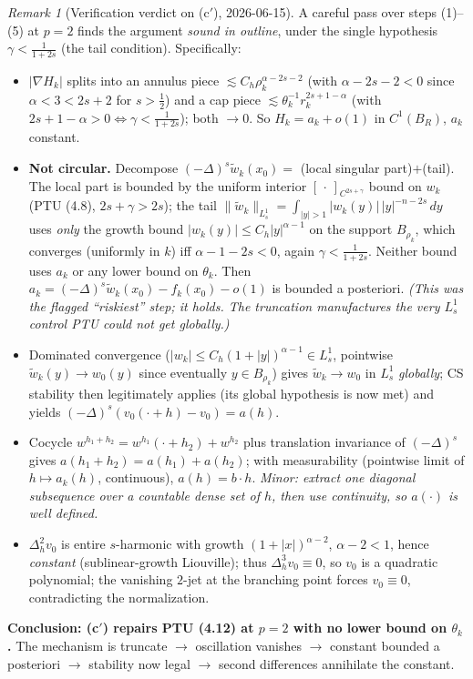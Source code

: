 \documentclass[11pt]{amsart}
\theoremstyle{plain}
\theoremstyle{definition}
\theoremstyle{remark}
\newtheorem{remark}[theorem]{Remark}
\newcommand{\al}{\alpha}
\begin{document}
\begin{remark}[Verification verdict on (c$'$), 2026-06-15]\label{rem:cprime-check}
A careful pass over steps (1)--(5) at $p=2$ finds the argument
\emph{sound in outline}, under the single hypothesis
$\gamma<\frac{1}{1+2s}$ (the tail condition). Specifically:
\begin{itemize}
\item[(1)] $|\nabla H_k|$ splits into an annulus piece
  $\lesssim C_h\rho_k^{\al-2s-2}$ (with $\al-2s-2<0$ since $\al<3<2s+2$
  for $s>\frac12$) and a cap piece $\lesssim\theta_k^{-1}r_k^{2s+1-\al}$
  (with $2s+1-\al>0\iff\gamma<\frac1{1+2s}$); both $\to0$. So
  $H_k=a_k+o(1)$ in $C^1(B_R)$, $a_k$ constant. \checkmark
\item[(2)] \textbf{Not circular.} Decompose
  $(-\Delta)^s\tilde w_k(x_0)=$ (local singular part)$+$(tail). The local
  part is bounded by the uniform interior $[\,\cdot\,]_{C^{2s+\gamma}}$
  bound on $w_k$ (PTU (4.8), $2s+\gamma>2s$); the tail
  $\|\tilde w_k\|_{L^1_s}=\int_{|y|>1}|w_k(y)|\,|y|^{-n-2s}\,dy$ uses
  \emph{only} the growth bound $|w_k(y)|\le C_h|y|^{\al-1}$ on the support
  $B_{\rho_k}$, which converges (uniformly in $k$) iff $\al-1-2s<0$, again
  $\gamma<\frac1{1+2s}$. Neither bound uses $a_k$ or any lower bound on
  $\theta_k$. Then $a_k=(-\Delta)^s\tilde w_k(x_0)-f_k(x_0)-o(1)$ is
  bounded a posteriori. \checkmark \emph{(This was the flagged ``riskiest''
  step; it holds. The truncation manufactures the very $L^1_s$ control PTU
  could not get globally.)}
\item[(3)] Dominated convergence ($|w_k|\le C_h(1+|y|)^{\al-1}\in L^1_s$,
  pointwise $\tilde w_k(y)\to w_0(y)$ since eventually $y\in B_{\rho_k}$)
  gives $\tilde w_k\to w_0$ in $L^1_s$ \emph{globally}; CS stability then
  legitimately applies (its global hypothesis is now met) and yields
  $(-\Delta)^s(v_0(\cdot+h)-v_0)=a(h)$. \checkmark
\item[(4)] Cocycle $w^{h_1+h_2}=w^{h_1}(\cdot+h_2)+w^{h_2}$ plus
  translation invariance of $(-\Delta)^s$ gives $a(h_1{+}h_2)=a(h_1)+a(h_2)$;
  with measurability (pointwise limit of $h\mapsto a_k(h)$, continuous),
  $a(h)=b\cdot h$. \checkmark \emph{Minor: extract one diagonal subsequence
  over a countable dense set of $h$, then use continuity, so $a(\cdot)$ is
  well defined.}
\item[(5)] $\Delta^2_hv_0$ is entire $s$-harmonic with growth
  $(1+|x|)^{\al-2}$, $\al-2<1$, hence \emph{constant} (sublinear-growth
  Liouville); thus $\Delta^3_hv_0\equiv0$, so $v_0$ is a quadratic
  polynomial; the vanishing $2$-jet at the branching point forces
  $v_0\equiv0$, contradicting the normalization. \checkmark
\end{itemize}
\textbf{Conclusion: (c$'$) repairs PTU (4.12) at $p=2$ with no lower bound
on $\theta_k$.} The mechanism is truncate $\to$ oscillation vanishes $\to$
constant bounded a posteriori $\to$ stability now legal $\to$ second
differences annihilate the constant.


\end{remark}
\end{document}
